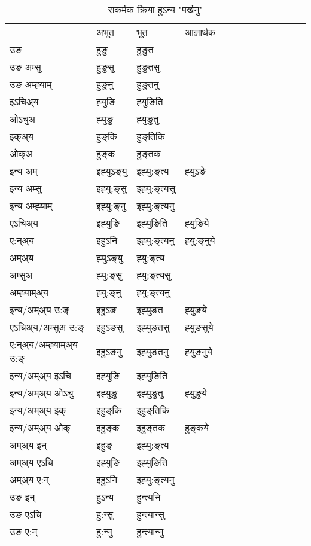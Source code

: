 \begin{table}[H]
\centering
\caption{\label{uŋ.vt} सकर्मक क्रिया  हुऽन्य  "पर्खनु"  }
\begin{tabular}{l|l|l|l|l|l|l|l|l|l|l|l|l}  \toprule
&अभूत & भूत & आज्ञार्थक \\ 
उङ &हुङु &हुङुत \\ 
उङ अम्सु &हुङुसु &हुङुतसु \\ 
उङ अम्ह्‍याम् &हुङुनु &हुङुतनु \\ 
इऽचिअ्य &ह्‍युङि &ह्‍युङिति   \\ 
ओऽचुअ &ह्‍युङु &ह्‍युङुतु   \\ 
इक्अ्य &हुङ्‌कि &हुङ्‌तिकि   \\ 
ओक्अ &हुङ्‌क &हुङ्‌तक   \\ 
इन्य अम् & इह्‍युऽङ्‌यु  & इह्‍यु:ङ्‌त्य &ह्‍युऽङे  \\ 
इन्य अम्सु & इह्‍यु:ङ्‌सु  & इह्‍यु:ङ्‌त्यसु   \\ 
इन्य अम्ह्‍याम् & इह्‍यु:ङ्‌नु  & इह्‍यु:ङ्‌त्यनु   \\ 
एऽचिअ्य & इह्‍युङि & इह्‍युङिति &ह्‍युङिये    \\ 
ए:न्अ्य & इहुऽनि  & इह्‍यु:ङ्‌त्यनु &ह्‍यु:ङ्‌नुये  \\ 
अम्अ्य & ह्‍युऽङ्‌यु  & ह्‍यु:ङ्‌त्य  \\ 
अम्सुअ & ह्‍यु:ङ्‌सु & ह्‍यु:ङ्‌त्यसु  \\ 
अम्ह्‍याम्अ्य & ह्‍यु:ङ्‌नु  & ह्‍यु:ङ्‌त्यनु \\ 
\midrule
इन्य/अम्अ्य उ:ङ्‌&इहुऽङ & इह्‍युङत &ह्‍युङये \\ 
एऽचिअ्य/अम्सुअ उ:ङ्‌ &इहुऽङसु & इह्‍युङतसु &ह्‍युङसुये \\ 
ए:न्अ्य/अम्ह्‍याम्अ्य उ:ङ्‌ &इहुऽङनु & इह्‍युङतनु &ह्‍युङनुये \\ 
इन्य/अम्अ्य इऽचि & इह्‍युङि & इह्‍युङिति    \\ 
इन्य/अम्अ्य ओऽचु & इह्‍युङु & इह्‍युङुतु  &ह्‍युङुये  \\ 
इन्य/अम्अ्य इक् & इहुङ्‌कि & इहुङ्‌तिकि   \\ 
इन्य/अम्अ्य ओक् & इहुङ्‌क & इहुङ्‌तक  &हुङ्‌कये  \\ 
अम्अ्य इन् & इहुङ्‌ & इह्‍यु:ङ्‌त्य   \\ 
अम्अ्य एऽचि & इह्‍युङि & इह्‍युङिति    \\ 
अम्अ्य ए:न् & इहुऽनि  & इह्‍यु:ङ्‌त्यनु  \\ 
\midrule
उङ इन् & हुऽन्य  & हुन्त्यनि  \\ 
उङ एऽचि & हु:न्सु  & हुन्त्यान्सु   \\ 
उङ ए:न्& हु:न्‍नु  & हुन्त्यान्‍नु   \\ 
\bottomrule
\end{tabular}
\end{table}


